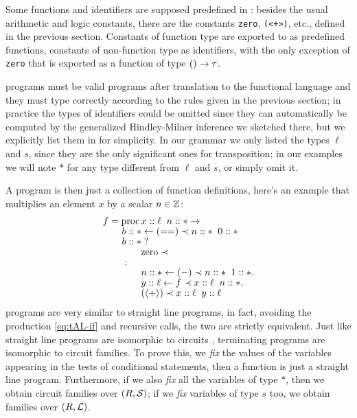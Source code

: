 Some functions and identifiers are supposed predefined in \tAL{}:
besides the usual arithmetic and logic constants, there are the
constants \lstinline{zero}, \lstinline{(<+>)}, etc., defined in the
previous section. Constants of function type are exported to \tAL{} as
predefined functions, constants of non-function type as identifiers,
with the only exception of \lstinline{zero} that is exported as a
function of type $()\rightarrow\tau$.

\tAL{} programs must be valid programs after translation to the
functional language and they must type correctly according to the
rules given in the previous section; in practice the types of
identifiers could be omitted since they can automatically be computed
by the generalized Hindley-Milner inference we sketched there, but we
explicitly list them in \tAL{} for simplicity. In our grammar we only
listed the types $\ell$ and $s$, since they are the only significant
ones for transposition; in our examples we will note $\ast$ for any
type different from $\ell$ and $s$, or simply omit it.

A \tAL{} program is then just a collection of function definitions,
here's an example that multiplies an element $x$ by a scalar $n\in\mathbb{Z}$:
\begin{equation}
  \label{eq:tALprog}
  \begin{aligned}
    &f = \operatorname{proc} x::\ell \;\; n::\ast \rightarrow\\[-1ex]
    &\qquad b::\ast \leftarrow (==) \prec n::\ast \;\; 0::\ast\\[-1ex]
    &\qquad b::\ast \;?\\[-1ex]
    &\qquad\qquad \text{zero} \prec\\[-1ex]
    &\qquad :\\[-1ex]
    &\qquad\qquad n::\ast \leftarrow (-) \prec n::\ast \;\; 1::\ast.\\[-1ex]
    &\qquad\qquad y::\ell \leftarrow f \prec x::\ell \;\; n::\ast.\\[-1ex]
    &\qquad\qquad (\langle+\rangle) \prec x::\ell \;\; y::\ell\\[-1ex]
  \end{aligned}
\end{equation}

\tAL{} programs are very similar to straight line programs, in fact,
avoiding the production \eqref{eq:tAL-if} and recursive calls, the two
are strictly equivalent. Just like straight line programs are
isomorphic to circuits \cite[Lemma 13.17]{BuClSh}, terminating \tAL{}
programs are isomorphic to circuit families. To prove this, we
\emph{fix} the values of the variables appearing in the tests of
conditional statements, then a \tAL{} function is just a straight line
program. Furthermore, if we also \emph{fix} all the variables of type
$*$, then we obtain circuit families over $(R,\mathcal{S})$; if we
\emph{fix} variables of type $s$ too, we obtain families over
$(R,\mathcal{L})$.

